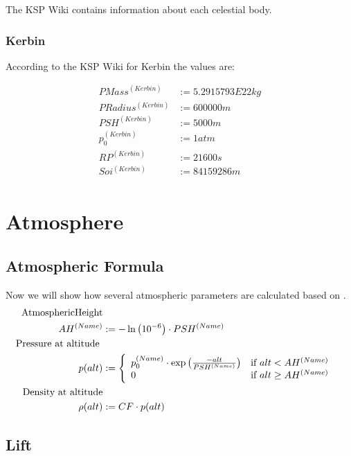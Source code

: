 \documentclass[11pt]{report}
\begin{document}
The KSP Wiki \cite{Wiki} contains information about each celestial
body.

\subsection{Kerbin}

According to the KSP Wiki for Kerbin the values are:

\begin{align*}
  PMass^{(Kerbin)} &:= 5.2915793E22 kg\\
  PRadius^{(Kerbin)} &:= 600000 m\\
  PSH^{(Kerbin)} &:= 5000 m\\
  p_0^{(Kerbin)} &:= 1 atm\\
  RP^{(Kerbin)} &:= 21600 s\\
  Soi^{(Kerbin)} &:= 84159286 m\\
\end{align*}

\chapter{Atmosphere}

\section{Atmospheric Formula}

Now we will show how several atmospheric parameters are calculated
based on \cite{Atmo}.
\begin{align}
  \index{Atmospheric Height} \textrm{AtmosphericHeight}\nonumber\\
  AH^{(Name)} &:= -\ln\left(10^{-6}\right)\cdot PSH^{(Name)}\label{AtmosphericHeightEquation}\\
  \index{Pressure} \textrm{Pressure at altitude }&\nonumber\\
  p(alt) &:=
  \left\{
      \begin{array}{l l}
        p_0^{(Name)} \cdot \exp\left({\frac{-alt}{PSH^{(Name)}}}\right) & \textrm{if } alt < AH^{(Name)}\\
        0 &\textrm{if } alt \geq AH^{(Name)}
      \end{array}
    \right.\\
    \index{Density} \textrm{Density at altitude}\nonumber\\
    \rho(alt) &:= CF \cdot p(alt)
\end{align}


\section{Lift}
\end{document}
